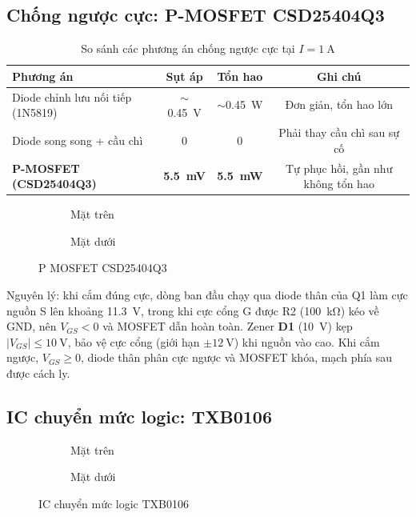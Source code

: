 \subsection{Chống ngược cực: P-MOSFET CSD25404Q3}
\begin{table}[H]
\centering\small
\caption{So sánh các phương án chống ngược cực tại $I=\SI{1}{\ampere}$}
\label{tab:sosanh_rpp}
\begin{tabular}{@{}lccc@{}}
\toprule
\textbf{Phương án} & \textbf{Sụt áp} & \textbf{Tổn hao} & \textbf{Ghi chú}\\
\midrule
Diode chỉnh lưu nối tiếp (1N5819) & $\sim$\SI{0.45}{\volt} & $\sim$\SI{0.45}{\watt} & Đơn giản, tổn hao lớn\\
Diode song song + cầu chì & 0 & 0 & Phải thay cầu chì sau sự cố\\
\textbf{P-MOSFET (CSD25404Q3)} & \textbf{\SI{5.5}{\milli\volt}} & \textbf{\SI{5.5}{\milli\watt}} & Tự phục hồi, gần như không tổn hao\\
\bottomrule
\end{tabular}
\end{table}

\begin{figure}[H]
\centering
\begin{subfigure}{0.45\linewidth}\centering{}\caption{Mặt trên}\end{subfigure}
\hfill
\begin{subfigure}{0.45\linewidth}\centering{}\caption{Mặt dưới}\end{subfigure}
\caption{P MOSFET CSD25404Q3}
\label{fig:CSD25404Q3}
\end{figure}

Nguyên lý: khi cắm đúng cực, dòng ban đầu chạy qua diode thân của Q1 làm cực nguồn S lên khoảng \SI{11.3}{\volt}, trong khi cực cổng G được R2 (\SI{100}{\kilo\ohm}) kéo về GND, nên $V_{GS}<0$ và MOSFET dẫn hoàn toàn. Zener \textbf{D1} (\SI{10}{\volt}) kẹp $|V_{GS}|\le\SI{10}{\volt}$, bảo vệ cực cổng (giới hạn $\pm\SI{12}{\volt}$) khi nguồn vào cao. Khi cắm ngược, $V_{GS}\ge0$, diode thân phân cực ngược và MOSFET khóa, mạch phía sau được cách ly.

\subsection{IC chuyển mức logic: TXB0106}

\begin{figure}[H]
\centering
\begin{subfigure}{0.45\linewidth}\centering{}\caption{Mặt trên}\end{subfigure}
\hfill
\begin{subfigure}{0.45\linewidth}\centering{}\caption{Mặt dưới}\end{subfigure}
\caption{IC chuyển mức logic TXB0106}
\label{fig:TXB0106}
\end{figure}

